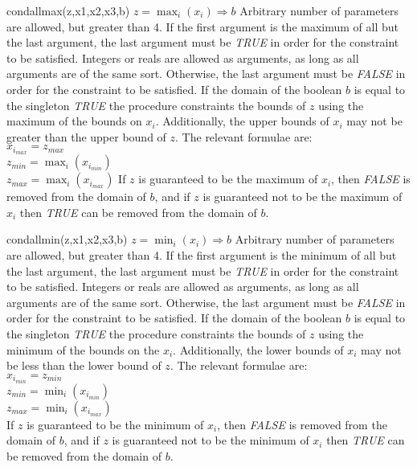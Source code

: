     {condallmax(z,x1,x2,x3,b)}
    {$z=\max_i(x_i) \Rightarrow b$}
    {Arbitrary number of parameters are allowed, but greater than 4.
    If the first argument is the maximum of all but the last argument,
    the last argument must be {\em TRUE} in order for the constraint to be satisfied.}
    {Integers or reals are allowed as arguments, as long as all arguments
    are of the same sort.}
    {Otherwise, the last argument must be {\em FALSE} in order for the constraint to be satisfied. 
    If the domain of the boolean $b$ is equal to the singleton {\em TRUE}
    the procedure constraints the bounds of $z$
    using the maximum of the bounds on $x_i$.  Additionally, the upper bounds
    of $x_i$ may not be greater than the upper bound of $z$.  The relevant
    formulae are:\\
    $x_{i_{max}} = z_{max}$\\
    $z_{min} = \max_i(x_{i_{min}})$\\
    $z_{max} = \max_i(x_{i_{max}})$
    If $z$ is guaranteed to be the maximum of $x_i$, then {\em FALSE} is
    removed from the domain of $b$, and if $z$ is guaranteed not to be the maximum
    of $x_i$  then {\em TRUE} can be removed from the domain of $b$.}

    {condallmin(z,x1,x2,x3,b)}
    {$z=\min_i(x_i) \Rightarrow b$}
    {Arbitrary number of parameters are allowed, but greater than 4.
    If the first argument is the minimum of all but the last argument,
    the last argument must be {\em TRUE} in order for the constraint to be satisfied.}
    {Integers or reals are allowed as arguments, as long as all arguments
    are of the same sort.}
    {Otherwise, the last argument must be {\em FALSE} in order for the constraint to be satisfied. 
    If the domain of the boolean $b$ is equal to the singleton {\em TRUE}    
    the procedure constraints the bounds of $z$
    using the minimum of the bounds on the $x_i$.  Additionally, the lower bounds
    of $x_i$ may not be less than the lower bound of $z$.  The relevant
    formulae are:\\
    $x_{i_{min}} = z_{min}$\\
    $z_{min} = \min_i(x_{i_{min}})$\\
    $z_{max} = \min_i(x_{i_{max}})$\\
    If $z$ is guaranteed to be the minimum of $x_i$, then {\em FALSE} is
    removed from the domain of $b$, and if $z$ is guaranteed not to be the minimum
    of $x_i$ then {\em TRUE} can be removed from the domain of $b$.}


